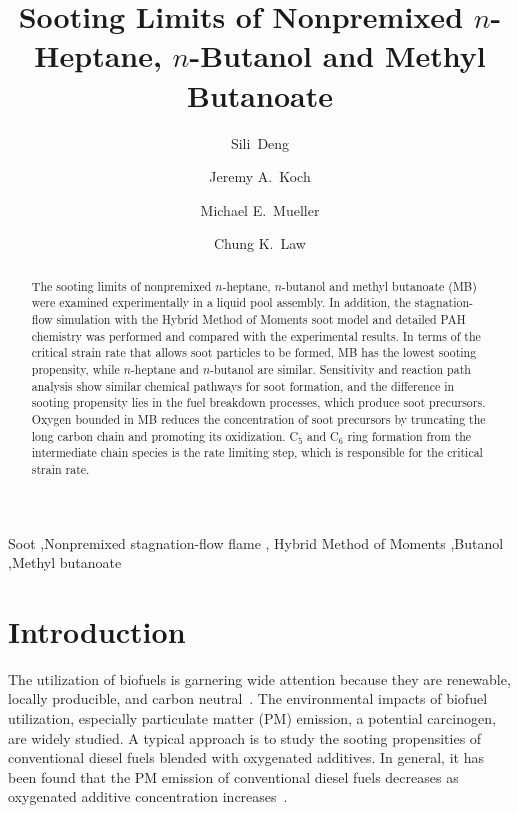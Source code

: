 \documentclass[preprint,3p,times,twocolumn]{elsarticleUS}
\begin{document}
\begin{frontmatter}

\title{Sooting Limits of Nonpremixed $n$-Heptane, $n$-Butanol and Methyl Butanoate}

\author{Sili~Deng}
\author{Jeremy A.~Koch}
\author{Michael E.~Mueller}
\author{Chung K.~Law}

\address{Department of Mechanical and Aerospace Engineering, Princeton University, Princeton, NJ 08544, USA}


\begin{abstract}
  The sooting limits of nonpremixed $n$-heptane, $n$-butanol and methyl butanoate (MB) were examined experimentally in a liquid pool assembly. In addition, the stagnation-flow simulation with the Hybrid Method of Moments soot model and detailed PAH chemistry was performed and compared with the experimental results. In terms of the critical strain rate that allows soot particles to be formed, MB has the lowest sooting propensity, while $n$-heptane and $n$-butanol are similar. Sensitivity and reaction path analysis show similar chemical pathways for soot formation, and the difference in sooting propensity lies in the fuel breakdown processes, which produce soot precursors. Oxygen bounded in MB reduces the concentration of soot precursors by truncating the long carbon chain and promoting its oxidization. C$_5$ and C$_6$ ring formation from the intermediate chain species is the rate limiting step, which is responsible for the critical strain rate.
\end{abstract}

\begin{keyword} 
Soot \sep Nonpremixed stagnation-flow flame \sep
Hybrid Method of Moments \sep Butanol \sep Methyl butanoate
\end{keyword}

\end{frontmatter}


\section{Introduction}

The utilization of biofuels is garnering wide attention because they are renewable, locally producible, and carbon neutral~\cite{liu11}. The environmental impacts of biofuel utilization, especially particulate matter (PM) emission, a potential carcinogen, are widely studied. A typical approach is to study the sooting propensities of conventional diesel fuels blended with oxygenated additives. In general, it has been found that the PM emission of conventional diesel fuels decreases as oxygenated additive concentration increases~\cite{graboski98}.
\end{document}
